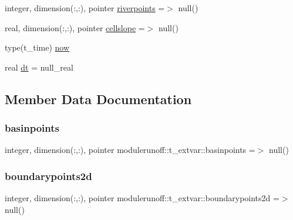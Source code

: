 \begin{DoxyCompactItemize}
\item 
integer, dimension(\+:,\+:), pointer \mbox{\hyperlink{structmodulerunoff_1_1t__extvar_af3984c7177af2246ce6f7dee0d36573c}{riverpoints}} =$>$ null()
\item 
real, dimension(\+:,\+:), pointer \mbox{\hyperlink{structmodulerunoff_1_1t__extvar_a1f16dfe7d08fa3e894872ebeecd8b39d}{cellslope}} =$>$ null()
\item 
type(t\+\_\+time) \mbox{\hyperlink{structmodulerunoff_1_1t__extvar_a71800710ccc008dd357ae3f3d0a28360}{now}}
\item 
real \mbox{\hyperlink{structmodulerunoff_1_1t__extvar_a6e91318dedf4d99882dbdecfec4bb631}{dt}} = null\+\_\+real
\end{DoxyCompactItemize}


\subsection{Member Data Documentation}
\mbox{\label{structmodulerunoff_1_1t__extvar_a05c43e178abf2be77a412ef9c8295ebd}} 
\subsubsection{\texorpdfstring{basinpoints}{basinpoints}}
{\footnotesize\ttfamily integer, dimension(\+:,\+:), pointer modulerunoff\+::t\+\_\+extvar\+::basinpoints =$>$ null()\hspace{0.3cm}{\ttfamily [private]}}

\mbox{\label{structmodulerunoff_1_1t__extvar_a130bc580d6ff8b8666fae6250533ce62}} 
\subsubsection{\texorpdfstring{boundarypoints2d}{boundarypoints2d}}
{\footnotesize\ttfamily integer, dimension(\+:,\+:), pointer modulerunoff\+::t\+\_\+extvar\+::boundarypoints2d =$>$ null()\hspace{0.3cm}{\ttfamily [private]}}

